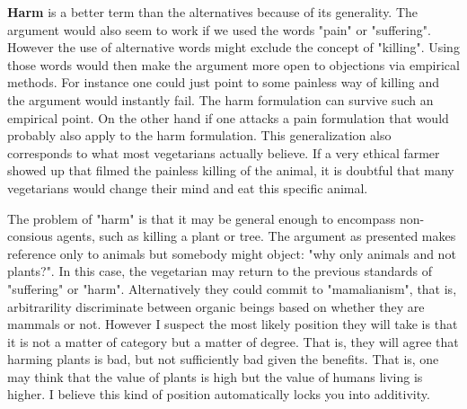 
\textbf{Harm} is a better term than the alternatives because of its generality. The argument would also seem to work if we used the words "pain" or "suffering". However the use of alternative words might exclude the concept of "killing". Using those words would then make the argument more open to objections via empirical methods. For instance one could just point to some painless way of killing and the argument would instantly fail. The harm formulation can survive such an empirical point. On the other hand if one attacks a pain formulation that would probably also apply to the harm formulation. This generalization also corresponds to what most vegetarians actually believe. If a very ethical farmer showed up that filmed the painless killing of the animal, it is doubtful that many vegetarians would change their mind and eat this specific animal. 

The problem of "harm" is that it may be general enough to encompass non-consious agents, such as killing a plant or tree. The argument as presented makes reference only to animals but somebody might object: "why only animals and not plants?". In this case, the vegetarian may return to the previous standards of "suffering" or "harm". Alternatively they could commit to "mamalianism", that is, arbitrarility discriminate between organic beings based on whether they are mammals or not. However I suspect the most likely position they will take is that it is not a matter of category but a matter of degree. That is, they will agree that harming plants is bad, but not sufficiently bad given the benefits. That is, one may think that the value of plants is high but the value of humans living is higher. I believe this kind of position automatically locks you into additivity.  





